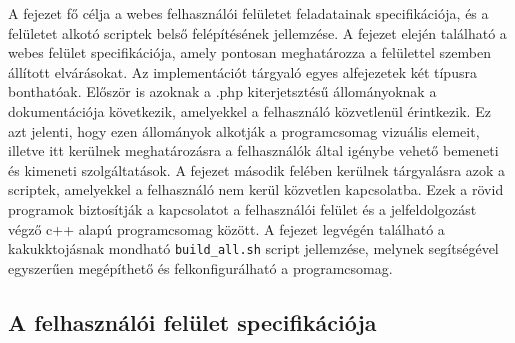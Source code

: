 \documentclass[oneside,titlepage,12pt,a4paper]{report}
\begin{document}
A fejezet fő célja a webes felhasználói felületet feladatainak specifikációja, és a felületet alkotó scriptek belső felépítésének jellemzése. A fejezet elején található a webes felület specifikációja, amely pontosan meghatározza a felülettel szemben állított elvárásokat. Az implementációt tárgyaló egyes alfejezetek két típusra bonthatóak. Először is azoknak a .php kiterjetsztésű állományoknak a dokumentációja következik, amelyekkel a felhasználó közvetlenül érintkezik. Ez azt jelenti, hogy ezen állományok alkotják a programcsomag vizuális elemeit, illetve itt kerülnek meghatározásra a felhasználók által igénybe vehető bemeneti és kimeneti szolgáltatások. A fejezet második felében kerülnek tárgyalásra azok a scriptek, amelyekkel a felhasználó nem kerül közvetlen kapcsolatba. Ezek a rövid programok biztosítják a kapcsolatot a felhasználói felület és a jelfeldolgozást végző c++ alapú programcsomag között. A fejezet legvégén található a kakukktojásnak mondható \texttt{build\_all.sh} script jellemzése, melynek segítségével egyszerűen megépíthető és felkonfigurálható a programcsomag. 

\subsection{A felhasználói felület specifikációja}
\end{document}
